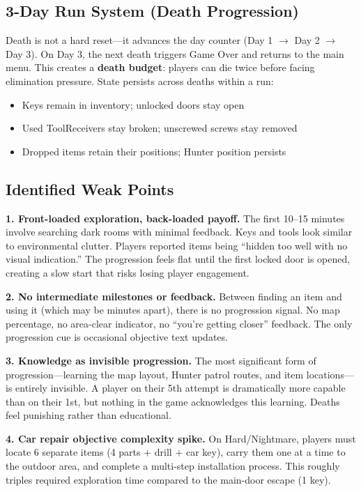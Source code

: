 \documentclass[11pt]{article}
\begin{document}
\subsection{3-Day Run System (Death Progression)}

Death is not a hard reset---it advances the day counter (Day 1 $\to$ Day 2 $\to$ Day 3). On Day 3, the next death triggers Game Over and returns to the main menu. This creates a \textbf{death budget}: players can die twice before facing elimination pressure. State persists across deaths within a run:

\begin{itemize}[nosep]
\item Keys remain in inventory; unlocked doors stay open
\item Used ToolReceivers stay broken; unscrewed screws stay removed
\item Dropped items retain their positions; Hunter position persists
\end{itemize}

\subsection{Identified Weak Points}

\textbf{1. Front-loaded exploration, back-loaded payoff.} The first 10--15 minutes involve searching dark rooms with minimal feedback. Keys and tools look similar to environmental clutter. Players reported items being ``hidden too well with no visual indication.'' The progression feels flat until the first locked door is opened, creating a slow start that risks losing player engagement.

\textbf{2. No intermediate milestones or feedback.} Between finding an item and using it (which may be minutes apart), there is no progression signal. No map percentage, no area-clear indicator, no ``you're getting closer'' feedback. The only progression cue is occasional objective text updates.

\textbf{3. Knowledge as invisible progression.} The most significant form of progression---learning the map layout, Hunter patrol routes, and item locations---is entirely invisible. A player on their 5th attempt is dramatically more capable than on their 1st, but nothing in the game acknowledges this learning. Deaths feel punishing rather than educational.

\textbf{4. Car repair objective complexity spike.} On Hard/Nightmare, players must locate 6 separate items (4 parts + drill + car key), carry them one at a time to the outdoor area, and complete a multi-step installation process. This roughly triples required exploration time compared to the main-door escape (1 key).
\end{document}
